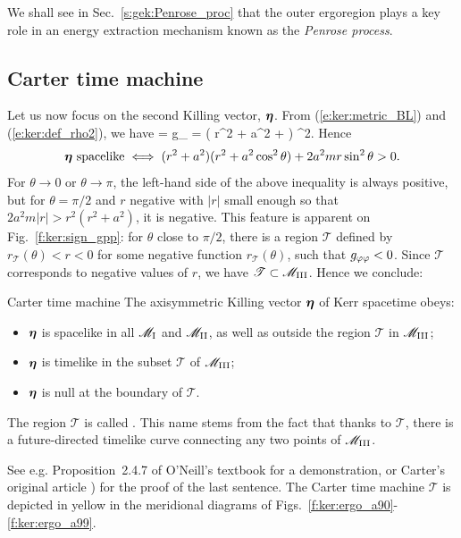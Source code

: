 We shall see in Sec.~\ref{s:gek:Penrose_proc} that the outer ergoregion
plays a key role in an energy extraction mechanism known as the
\emph{Penrose process}.

\subsection{Carter time machine} \label{s:ker:time_machine}

Let us now focus on the second Killing vector, $\bm{\eta}$.
From (\ref{e:ker:metric_BL}) and (\ref{e:ker:def_rho2}), we have
\be \label{e:ker:eta_square}
    \w{\eta}\cdot\w{\eta} = g_{\ph\ph} = \left( r^2 + a^2 +  \right) \sin^2\th .
\ee
Hence
\[
    \w{\eta}\ \mbox{spacelike} \iff
        (r^2 + a^2)(r^2 + a^2\cos^2\th) + 2 a^2 m r \sin^2\th > 0 .
\]
For $\theta\rightarrow 0$ or $\theta\rightarrow\pi$, the left-hand side of the above inequality
is always positive, but for $\theta=\pi/2$ and $r$ negative with $|r|$
small enough so that $2 a^2 m |r| > r^2(r^2 + a^2)$, it is negative. This feature
is apparent on Fig.~\ref{f:ker:sign_gpp}: for $\theta$ close to $\pi/2$,
there is a region $\mathscr{T}$ defined by $r_{\mathscr{T}}(\theta) < r < 0$ for some
negative function $r_{\mathscr{T}}(\theta)$, such that $g_{\varphi\varphi}<0$.
Since $\mathscr{T}$ corresponds to negative values of $r$, we have
$\mathscr{T}\subset \mathscr{M}_{\rm III}$.
Hence we conclude:

\begin{tprop}{Carter time machine}{}
The axisymmetric Killing vector $\bm{\eta}$ of Kerr spacetime obeys:
\begin{itemize}
\item $\bm{\eta}$ is spacelike in all $\mathscr{M}_{\rm I}$ and $\mathscr{M}_{\rm II}$, as well
as outside the region $\mathscr{T}$ in $\mathscr{M}_{\rm III}$;
\item $\bm{\eta}$ is timelike in the subset $\mathscr{T}$ of $\mathscr{M}_{\rm III}$;
\item $\bm{\eta}$ is null at the boundary of $\mathscr{T}$.
\end{itemize}
The region $\mathscr{T}$ is called
.
This name stems from the fact that thanks to $\mathscr{T}$, there is
a future-directed timelike curve connecting any two points of $\mathscr{M}_{\rm III}$.
\end{tprop}
See e.g. Proposition~2.4.7 of O'Neill's textbook \cite{ONeil95} for a
demonstration, or Carter's original article \cite{Carte68a}) for the
proof of the last sentence.
The Carter time machine $\mathscr{T}$  is depicted in yellow in the meridional
diagrams of Figs.~\ref{f:ker:ergo_a90}-\ref{f:ker:ergo_a99}.


